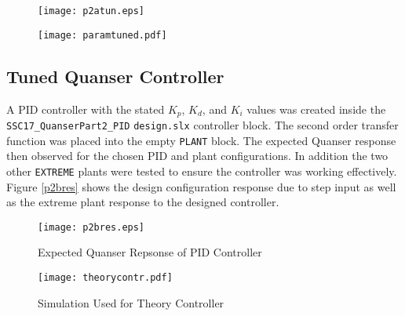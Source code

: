 \begin{figure}[H]
\centering
\begin{minipage}{.5\textwidth}
 \centering
 \texttt{[image: p2atun.eps]}
 \vspace{-20pt}
 \ 
 \label{p2atun}
\end{minipage}
\hfill
\begin{minipage}{.35\textwidth}
\centering
{}
\vspace{-10pt}
\texttt{[image: paramtuned.pdf]}
\label{paramtab}
\end{minipage}
\vspace{-20pt}
\end{figure}

\subsection{Tuned Quanser Controller}\label{tuned-quanser-controller}

A PID controller with the stated \(K_p\), \(K_d\), and \(K_i\) values
was created inside the \texttt{SSC17\_QuanserPart2\_PID}
\texttt{design.slx} controller block. The second order transfer function
was placed into the empty \texttt{PLANT} block. The expected Quanser
response then observed for the chosen PID and plant configurations. In
addition the two other \texttt{EXTREME} plants were tested to ensure the
controller was working effectively. Figure \ref{p2bres} shows the design
configuration response due to step input as well as the extreme plant
response to the designed controller.

\begin{figure}[H]
\centering
\begin{minipage}{.495\textwidth}
 \centering
 \texttt{[image: p2bres.eps]}
 \vspace{-20pt}
 \caption{Expected Quanser Repsonse of PID Controller}
 \label{p2bres}
\end{minipage}
\hfill
\begin{minipage}{.495\textwidth}
\centering
\texttt{[image: theorycontr.pdf]}
\vspace{-10pt}
\caption{Simulation Used for Theory Controller}
\label{paramtab}
\end{minipage}
\vspace{-20pt}
\end{figure}
